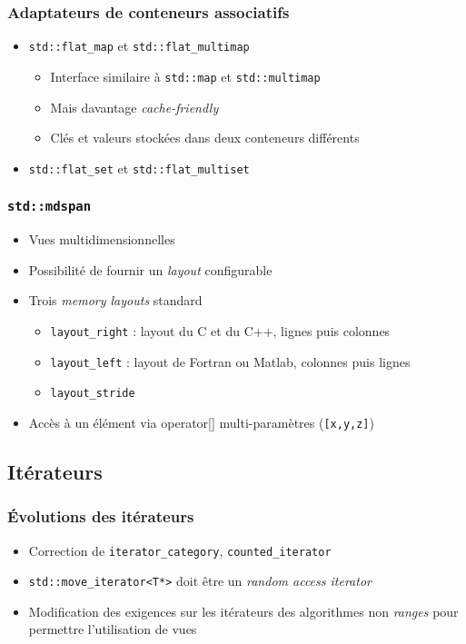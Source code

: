\documentclass[C++.tex]{subfiles}
\begin{document}
\begin{frame}[fragile]
	\frametitle{Adaptateurs de conteneurs associatifs}
	\begin{itemize}
		\item \lstinline|std::flat_map| et \lstinline|std::flat_multimap|
		\begin{itemize}
			\item Interface similaire à \lstinline|std::map| et \lstinline|std::multimap|
			\item Mais davantage \textit{cache-friendly}
			\item Clés et valeurs stockées dans deux conteneurs différents
		\end{itemize}
		\item \lstinline|std::flat_set| et \lstinline|std::flat_multiset|
	\end{itemize}
\end{frame}

\begin{frame}[fragile]
	\frametitle{\lstinline|std::mdspan|}
	\begin{itemize}
		\item Vues multidimensionnelles
		\item Possibilité de fournir un \textit{layout} configurable
		\item Trois \textit{memory layouts} standard
		\begin{itemize}
			\item \lstinline|layout_right| : layout du C et du C++, lignes puis colonnes
			\item \lstinline|layout_left| : layout de Fortran ou Matlab, colonnes puis lignes
			\item \lstinline|layout_stride| 
		\end{itemize}
		\item Accès à un élément via operator[] multi-paramètres (\lstinline|[x,y,z]|)
	\end{itemize}
\end{frame}

\subsection*{Itérateurs}
\begin{frame}[fragile]
	\frametitle{Évolutions des itérateurs}
	\begin{itemize}
		\item Correction de \lstinline|iterator_category|, \lstinline|counted_iterator|
		\item \lstinline|std::move_iterator<T*>| doit être un \textit{random access iterator}
		\item Modification des exigences sur les itérateurs des algorithmes \og{}non \textit{ranges}\fg{} pour permettre l'utilisation de vues
	\end{itemize}
\end{frame}
\end{document}
